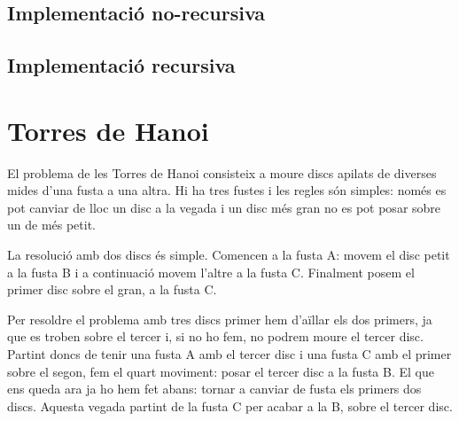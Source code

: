 \subsection{Implementació no-recursiva}

\vspace{1em}

\subsection{Implementació recursiva}

\vspace{1em}

\section{Torres de Hanoi}
El problema de les Torres de Hanoi consisteix a moure discs apilats de diverses mides d'una fusta a una altra.
Hi ha tres fustes i les regles són simples: només es pot canviar de lloc un disc a la vegada i un disc més gran no es pot posar sobre un de més petit.

La resolució amb dos discs és simple. Comencen a la fusta A: movem el disc petit a la fusta B i a continuació movem l'altre a la fusta C. Finalment posem el primer disc sobre el gran, a la fusta C.

\vspace{1em}
\begin{centering}
	\resizebox{0.48\textwidth}{!}{}\hfill
	\resizebox{0.48\textwidth}{!}{}
	
	\vspace{2em}

	\resizebox{0.48\textwidth}{!}{}\hfill
	\resizebox{0.48\textwidth}{!}{}

\end{centering}
\vspace{1em}

Per resoldre el problema amb tres discs primer hem d'aïllar els dos primers, ja que es troben sobre el tercer i, si no ho fem, no podrem moure el tercer disc.
Partint doncs de tenir una fusta A amb el tercer disc i una fusta C amb el primer sobre el segon, fem el quart moviment: posar el tercer disc a la fusta B.
El que ens queda ara ja ho hem fet abans: tornar a canviar de fusta els primers dos discs.
Aquesta vegada partint de la fusta C per acabar a la B, sobre el tercer disc.

